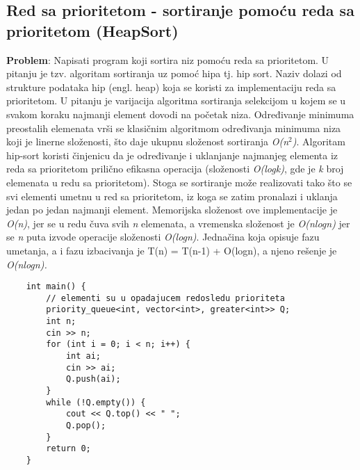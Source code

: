 \documentclass{article}
\begin{document}
\newpage
\subsection{Red sa prioritetom - sortiranje pomoću reda sa prioritetom (HeapSort)}
\textbf{Problem}: Napisati program koji sortira niz pomoću reda sa prioritetom.
\newline 
U pitanju je tzv. algoritam sortiranja uz pomoć hipa tj. hip sort. Naziv dolazi od strukture podataka hip (engl. heap) koja se koristi za
implementaciju reda sa prioritetom. U pitanju je varijacija algoritma sortiranja
selekcijom u kojem se u svakom koraku
najmanji element dovodi na početak niza. Određivanje minimuma preostalih
elemenata vrši se klasičnim algoritmom određivanja minimuma niza  koji je linerne složenosti, što daje ukupnu složenost sortiranja \textit{O(n$^2$)}. Algoritam hip-sort koristi činjenicu da je određivanje i uklanjanje
najmanjeg elementa iz reda sa prioritetom prilično efikasna operacija (složenosti\textit{ O(logk)}, gde je \textit{k} broj elemenata u redu sa prioritetom). Stoga se
sortiranje može realizovati tako što se svi elementi umetnu u red sa prioritetom,
iz koga se zatim pronalazi i uklanja jedan po jedan najmanji element.
\newline 
Memorijska složenost ove implementacije je \textit{O(n)}, jer se u redu čuva svih \textit{n}
elemenata, a vremenska složenost je \textit{O(nlogn)} jer se \textit{n} puta izvode operacije
složenosti \textit{O(logn)}. Jednačina koja opisuje fazu umetanja, a i fazu izbacivanja je T(n) = T(n-1) + O(logn), a njeno rešenje je \textit{O(nlogn).}
\begin{lstlisting}
    int main() {
        // elementi su u opadajucem redosledu prioriteta
        priority_queue<int, vector<int>, greater<int>> Q;
        int n;
        cin >> n;
        for (int i = 0; i < n; i++) {
            int ai;
            cin >> ai;
            Q.push(ai);
        }
        while (!Q.empty()) {    
            cout << Q.top() << " ";
            Q.pop();
        }
        return 0;
    }
\end{lstlisting}
\end{document}
